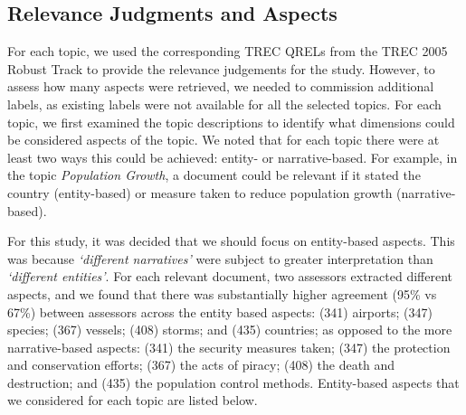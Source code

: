 \subsection{Relevance Judgments and Aspects}\label{sec:method:entities}
For each topic, we used the corresponding TREC QRELs from the TREC 2005 Robust Track to provide the relevance judgements for the study. However, to assess how many aspects were retrieved, we needed to commission additional labels, as existing labels were not available for all the selected topics. For each topic, we first examined the topic descriptions to identify what dimensions could be considered aspects of the topic. We noted that for each topic there were at least two ways this could be achieved: entity- or narrative-based. For example, in the topic \emph{Population Growth}, a document could be relevant if it stated the country (entity-based) or measure taken to reduce population growth (narrative-based).

For this study, it was decided that we should focus on entity-based aspects. This was because \emph{`different narratives'} were subject to greater interpretation than \emph{`different entities'}. For each relevant document, two assessors extracted different aspects, and we found that there was substantially higher agreement (95\% vs 67\%) between assessors across the entity based aspects: (341) airports; (347) species; (367) vessels; (408) storms; and  (435) countries; as opposed to the more narrative-based aspects: (341) the security measures taken; (347) the protection and conservation efforts; (367) the acts of piracy; (408) the death and destruction; and (435) the population control methods. Entity-based aspects that we considered for each topic are listed below.

